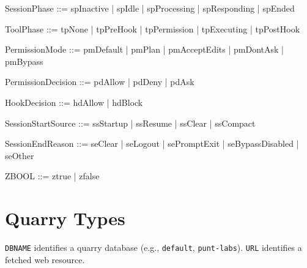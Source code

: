 \documentclass[a4paper,10pt,fleqn]{article}
\begin{document}
\begin{zed}
\end{zed}

\begin{zed}
  SessionPhase ::= spInactive | spIdle | spProcessing | spResponding | spEnded
\end{zed}

\begin{zed}
  ToolPhase ::= tpNone | tpPreHook | tpPermission | tpExecuting | tpPostHook
\end{zed}

\begin{zed}
  PermissionMode ::= pmDefault | pmPlan | pmAcceptEdits | pmDontAsk | pmBypass
\end{zed}

\begin{zed}
  PermissionDecision ::= pdAllow | pdDeny | pdAsk
\end{zed}

\begin{zed}
  HookDecision ::= hdAllow | hdBlock
\end{zed}

\begin{zed}
  SessionStartSource ::= ssStartup | ssResume | ssClear | ssCompact
\end{zed}

\begin{zed}
  SessionEndReason ::= seClear | seLogout | sePromptExit | seBypassDisabled | seOther
\end{zed}

\begin{zed}
  ZBOOL ::= ztrue | zfalse
\end{zed}

\section{Quarry Types}

\begin{zed}
\end{zed}

\texttt{DBNAME} identifies a quarry database (e.g., \texttt{default},
\texttt{punt-labs}). \texttt{URL} identifies a fetched web resource.

\end{document}
